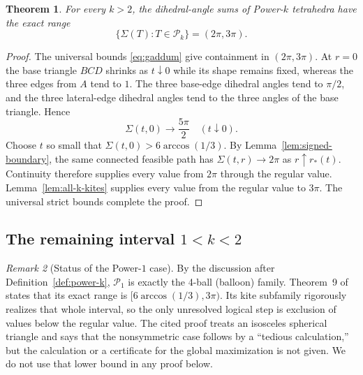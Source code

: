 \documentclass[11pt,a4paper]{article}
\newtheorem{theorem}{Theorem}[section]
\theoremstyle{definition}
\theoremstyle{remark}
\newtheorem{remark}[theorem]{Remark}
\begin{document}
\begin{theorem}\label{thm:k-above-two}
For every $k>2$, the dihedral-angle sums of Power-$k$ tetrahedra have the
exact range
\begin{equation}\label{eq:k-above-two-range}
 \boxed{\{\Sigma(T):T\in\mathcal P_k\}=(2\pi,3\pi).}
\end{equation}
\end{theorem}

\begin{proof}
The universal bounds \eqref{eq:gaddum} give containment in $(2\pi,3\pi)$.
At $r=0$ the base triangle $BCD$ shrinks as $t\downarrow0$ while its shape
remains fixed, whereas the three edges from $A$ tend to $1$.  The three
base-edge dihedral angles tend to $\pi/2$, and the three lateral-edge
dihedral angles tend to the three angles of the base triangle.  Hence
\begin{equation}\label{eq:tall-limit}
 \Sigma(t,0)\longrightarrow\frac{5\pi}{2}
 \quad(t\downarrow0).
\end{equation}
Choose $t$ so small that
$\Sigma(t,0)>6\arccos(1/3)$.  By Lemma~\ref{lem:signed-boundary}, the same
connected feasible path has $\Sigma(t,r)\to2\pi$ as
$r\uparrow r_*(t)$.  Continuity therefore supplies every value from $2\pi$
through the regular value.  Lemma~\ref{lem:all-k-kites} supplies every value
from the regular value to $3\pi$.  The universal strict bounds complete the
proof.
\end{proof}

\subsection{\texorpdfstring{The remaining interval $1<k<2$}
{The remaining interval between 1 and 2}}

\begin{remark}[Status of the Power-$1$ case]\label{rem:power-one-status}
By the discussion after Definition~\ref{def:power-k}, $\mathcal P_1$ is
exactly the 4-ball (balloon) family.  Theorem~9 of
\cite{KorotovKrizek2026} states that its exact range is
$[6\arccos(1/3),3\pi)$.  Its kite subfamily rigorously realizes that whole
interval, so the only unresolved logical step is exclusion of values below
the regular value.  The cited proof treats an isosceles spherical triangle
and says that the nonsymmetric case follows by a ``tedious calculation,''
but the calculation or a certificate for the global maximization is not
given.  We do not use that lower bound in any proof below.
\end{remark}
\end{document}
